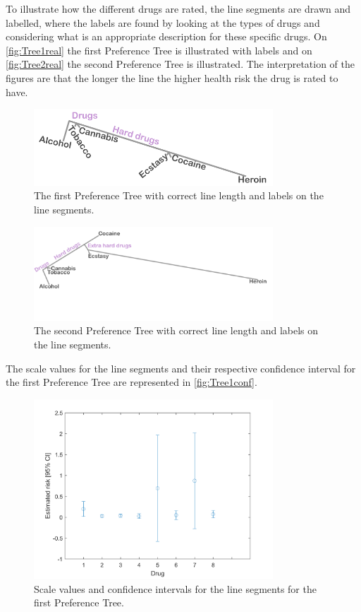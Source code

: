 \noindent 
%
To illustrate how the different drugs are rated, the line segments are drawn and labelled, where the labels are found by looking at the types of drugs and considering what is an appropriate description for these specific drugs. On \autoref{fig:Tree1real} the first Preference Tree is illustrated with labels and on \autoref{fig:Tree2real} the second Preference Tree is illustrated. The interpretation of the figures are that the longer the line the higher health risk the drug is rated to have.  
%
\begin{figure}[H]
\centering
\includegraphics[width = 0.80\textwidth]{Figure/Tree1real}
\caption{The first Preference Tree with correct line length and labels on the line segments.}
\label{fig:Tree1real}
\end{figure}
\noindent
%
\begin{figure}[H]
	\centering
	\includegraphics[width = 0.80\textwidth]{Figure/Tree2real}
	\caption{The second Preference Tree with correct line length and labels on the line segments.}
	\label{fig:Tree2real}
\end{figure}
\noindent
%
The scale values for the line segments and their respective confidence interval for the first Preference Tree are represented in \autoref{fig:Tree1conf}.
%
\begin{figure}[H]
	\centering
	\includegraphics[width = 0.80\textwidth]{Figure/confidense_p1220}
	\caption{Scale values and confidence intervals for the line segments for the first Preference Tree.}
	\label{fig:Tree1conf}
\end{figure}
